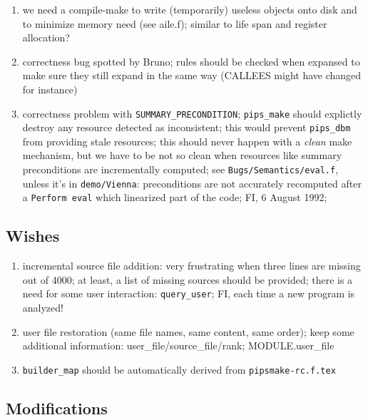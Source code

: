 \begin{enumerate}
  \item we need a compile-make to write (temporarily) useless objects
	onto disk and to minimize memory need (see aile.f); similar to
	life span and register allocation?

  \item correctness bug spotted by Bruno; rules should be checked when expansed
	to make sure they still expand in the same way (CALLEES might have
	changed for instance)

  \item correctness problem with \verb+SUMMARY_PRECONDITION+; \verb+pips_make+
	should explictly destroy any resource detected as inconsistent; this
	would prevent \verb+pips_dbm+ from providing stale resources; this
	should never happen with a {\em clean} make mechanism, but we have
	to be not so clean when resources like summary preconditions are
	incrementally computed; see \verb+Bugs/Semantics/eval.f+, unless
	it's in \verb+demo/Vienna+: preconditions are not accurately recomputed
	after a \verb+Perform eval+ which linearized part of the code;
	FI, 6 August 1992;

\end{enumerate}

\subsection{Wishes}

\begin{enumerate}

  \item incremental source file addition: very frustrating when three
	lines are missing out of 4000; at least, a list of missing sources
	should be provided; there is a need for some user interaction:
	\verb+query_user+; FI, each time a new program is analyzed!

  \item user file restoration (same file names, same content, same order);
	keep some additional information: user\_file/source\_file/rank;
	MODULE.user\_file

  \item \verb+builder_map+ should be automatically derived from
	\verb+pipsmake-rc.f.tex+

\end{enumerate}

\subsection{Modifications}


